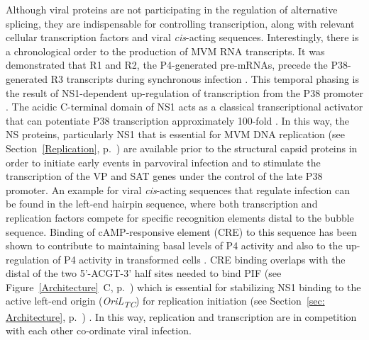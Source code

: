 Although viral proteins are not participating in the regulation of alternative splicing, they are indispensable for controlling transcription, along with relevant cellular transcription factors and viral \textit{cis}-acting sequences. Interestingly, there is a chronological order to the production of MVM RNA transcripts. It was demonstrated that R1 and R2, the P4-generated pre-mRNAs, precede the P38-generated R3 transcripts during synchronous infection \cite{pmid3346950}. This temporal phasing is the result of NS1-dependent up-regulation of transcription from the P38 promoter \cite{pmid3171551, pmid4020972}. The acidic C-terminal domain of NS1 acts as a classical transcriptional activator that can potentiate P38 transcription approximately 100-fold \cite{pmid1388209}. In this way, the NS proteins, particularly NS1 that is essential for MVM DNA replication (see Section~\ref{Replication}, p.~\pageref{Replication}) are available prior to the structural capsid proteins in order to initiate early events in parvoviral infection and to stimulate the transcription of the VP and SAT genes under the control of the late P38 promoter. An example for viral \textit{cis}-acting sequences that regulate infection can be found in the left-end hairpin sequence, where both transcription and replication factors compete for specific recognition elements distal to the bubble sequence. Binding of cAMP-responsive element (CRE) to this sequence has been shown to contribute to maintaining basal levels of P4 activity and also to the up-regulation of P4 activity in transformed cells \cite{pmid7636996, pmid8627649}. CRE binding overlaps with the distal of the two 5'-ACGT-3' half sites needed to bind PIF (see Figure~\ref{Architecture}~C, p.~\pageref{Architecture}) which is essential for stabilizing NS1 binding to the active left-end origin (\textit{OriL\textsubscript{TC}}) for replication initiation (see Section~\ref{sec: Architecture}, p.~\pageref{sec: Architecture}) \cite{pmid12050365}. In this way, replication and transcription are in competition with each other co-ordinate viral infection.            

       

